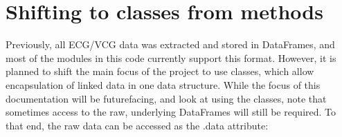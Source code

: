 \documentclass[letterpaper,10pt,english]{sphinxmanual}
\begin{document}
\begin{sphinxVerbatim}[commandchars=\\\{\}]
 
 
  
  
\end{sphinxVerbatim}


\section{Shifting to classes from methods}
\label{\detokenize{usage:shifting-to-classes-from-methods}}\label{\detokenize{usage:classplan}}
\sphinxAtStartPar
Previously, all ECG/VCG data was extracted and stored in DataFrames, and most of the modules in this code currently support this format. However, it is planned to shift the main focus of the project to use classes, which allow encapsulation of linked data in one data structure. While the focus of this documentation will be future\sphinxhyphen{}facing, and look at using the classes, note that sometimes access to the raw, underlying DataFrames will still be required. To that end, the raw data can be accessed as the .data attribute:

\begin{sphinxVerbatim}[commandchars=\\\{\}]
   
    
                        
                        
\end{sphinxVerbatim}
\end{document}
